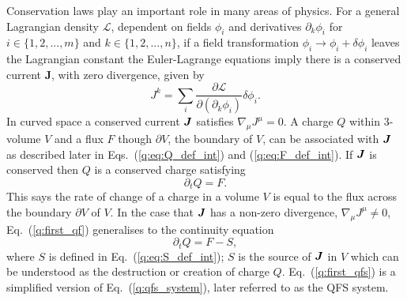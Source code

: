 Conservation laws play an important role in many areas of physics. For a general Lagrangian density $\mathcal{L}$, dependent on fields $\phi_i$ and derivatives $\partial_k \phi_i$ for $i \in \{1,2,...,m \}$ and $k \in \{1,2,...,n \}$, if a field transformation $\phi_i \rightarrow \phi_i + \delta \phi_i$ leaves the Lagrangian constant the Euler-Lagrange equations imply there is a conserved current $\boldsymbol{J}$, with zero divergence, given by
\begin{equation}
J^k = \sum_i \frac{\partial \mathcal{L}}{\partial (\partial_k \phi_i)}\delta \phi_i.
\end{equation}
In curved space a conserved current $\boldsymbol{J}$ satisfies $\nabla_\mu J^\mu = 0$. A charge $Q$ within 3-volume $V$ and a flux $F$ though $\partial V$, the boundary of $V$, can be associated with $\boldsymbol{J}$ as described later in Eqs.~(\ref{q:eq:Q_def_int}) and (\ref{q:eq:F_def_int}). If $\boldsymbol{J}$ is conserved then $Q$ is a conserved charge satisfying
\begin{equation}
\label{q:first_qf}\partial_t Q = {F}.
\end{equation}
This says the rate of change of a charge in a volume $V$ is equal to the flux across the boundary $\partial V$ of $V$. In the case that $\boldsymbol{J}$ has a non-zero divergence, $\nabla_\mu J^\mu \neq 0$, Eq.~(\ref{q:first_qf}) generalises to the continuity equation
\begin{equation}
\label{q:first_qfs}\partial_t {Q} = {F} - {S},
\end{equation}
where $S$ is defined in Eq.~(\ref{q:eq:S_def_int}); ${S}$ is the source of $\boldsymbol{J}$ in $V$ which can be understood as the destruction or creation of charge $Q$. Eq.~(\ref{q:first_qfs}) is a simplified version of Eq.~(\ref{q:qfs_system}), later referred to as the QFS system.


